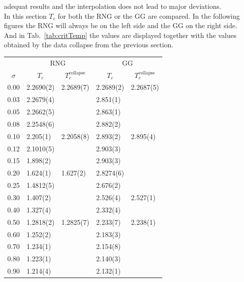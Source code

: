     adequat results and the interpolation does not lead to major
    deviations.\\
    In this section \(T_c\) for both the RNG or the GG are
    compared. In the following figures the RNG will always be on the
    left side and the GG on the right side.
    And in Tab.\ \ref{tab:critTemp} the values are displayed together with the
    values obtained by the data collapse from the previous section.
    \begin{table}[htbp]
        \center
        \begin{tabular}{l l l l l}
            \toprule
             & \multicolumn{2}{c}{RNG} & \multicolumn{2}{c}{GG}\\
            \cmidrule(rl){2-3} \cmidrule(rl){4-5}
            \multicolumn{1}{c}{\(\sigma\)} & \multicolumn{1}{c}{\(T_c\)} & \multicolumn{1}{c}{\(T_c^{\mathrm{collapse}}\)} & \multicolumn{1}{c}{\(T_c\)} & \multicolumn{1}{c}{\(T_c^{\mathrm{collapse}}\)}\\
            \midrule
            0.00 & 2.2690(2)& 2.2689(7)& 2.2689(2)& 2.2687(5)\\
            0.03 & 2.2679(4)&          & 2.851(1) &         \\
            0.05 & 2.2662(5)&          & 2.863(1) &         \\
            0.08 & 2.2548(6)&          & 2.882(2) &         \\
            0.10 & 2.205(1) & 2.2058(8)& 2.893(2) & 2.895(4)\\
            0.12 & 2.1010(5)&          & 2.903(3) &         \\
            0.15 & 1.898(2) &          & 2.903(3) &         \\
            0.20 & 1.624(1) & 1.627(2) & 2.8274(6)&         \\
            0.25 & 1.4812(5)&          & 2.676(2) &         \\
            0.30 & 1.407(2) &          & 2.526(4) & 2.527(1)\\
            0.40 & 1.327(4) &          & 2.332(4) &         \\
            0.50 & 1.2818(2)& 1.2825(7)& 2.233(7) & 2.238(1)\\
            0.60 & 1.252(2) &          & 2.183(3) &         \\
            0.70 & 1.234(1) &          & 2.154(8) &         \\
            0.80 & 1.223(1) &          & 2.140(3) &         \\
            0.90 & 1.214(4) &          & 2.132(1) &         \\

\end{tabular}
\end{table}
